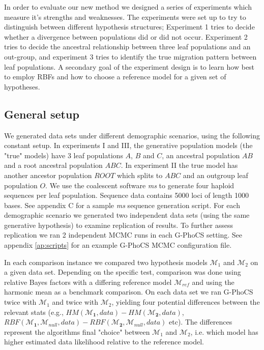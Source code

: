 \documentclass[11pt]{article}
\newcommand{\M}{\mathcal{M}}
\newcommand{\1}{\mathbbm{1}}
\newcommand{\gp}{G-PhoCS }
\begin{document}
In order to evaluate our new method we designed a series of experiments which measure it's strengths and weaknesses. 
%
The experiments were set up to try to distinguish between different hypothesis structures;
%
Experiment 1 tries to decide whether a divergence between populations did or did not occur. 
%
Experiment 2 tries to decide the ancestral relationship between three leaf populations and an out-group,
%
and experiment 3 tries to identify the true migration pattern between leaf populations. 
%
A secondary goal of the experiment design is to learn how best to employ RBFs and how to choose a reference model for a given set of hypotheses.

\subsection{General setup}
%
We generated data sets under different demographic scenarios, using the following constant setup. 
%
In experiments I and III, the generative population models (the "true" models) have 3 leaf populations $A$, $B$ and $C$, an ancestral population $AB$ and a root ancestral population $ABC$. 
%
In experiment II the true model has another ancestor population $ROOT$ which splits to $ABC$ and an outgroup leaf population $O$. 
%
We use the coalescent software \textit{ms} to generate four haploid sequences per leaf population. Sequence data contains 5000 loci of length 1000 bases. See appendix C for a sample  \textit{ms} sequence generation script.
%
For each demographic scenario we generated two independent data sets (using the same generative hypothesis) to examine replication of results. 
%
To further assess replication we ran 2 independent MCMC runs in each G-PhoCS setting. See appendix \ref{ap:scripts} for an example \gp MCMC configuration file.


In each comparison instance we compared two hypothesis models $\M_1$ and $\M_2$ on a given data set. 
%
Depending on the specific test, comparison was done using relative Bayes factors with a differing reference model $\M_{ref}$ and using the harmonic mean as a benchmark comparison. 
%
On each data set we ran \gp twice with $\M_1$ and twice with $\M_2$, yielding four potential differences between the relevant stats (e.g., $HM(\M_{\mathbf{1}}, data) - HM(\M_{\mathbf{2}},data)$, $RBF(\M_{\mathbf{1}}, \M_{null}, data) - RBF(\M_{\mathbf{2}}, \M_{null}, data)$ etc). 
%
The differences represent the algorithms final "choice" between $\M_1$ and $\M_2$, i.e. which model has higher estimated data likelihood relative to the reference model.
\end{document}
